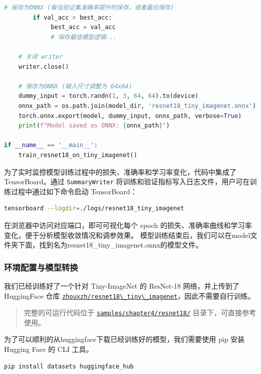 \begin{lstlisting}[language=Python]
        # 保存为ONNX (每当验证集准确率提升时保存，或者最后保存)
        if val_acc > best_acc:
             best_acc = val_acc
             # 保存最佳模型逻辑...
    
    # 关闭 writer
    writer.close()

    # 保存为ONNX (输入尺寸调整为 64x64)
    dummy_input = torch.randn(1, 3, 64, 64).to(device)
    onnx_path = os.path.join(model_dir, 'resnet18_tiny_imagenet.onnx')
    torch.onnx.export(model, dummy_input, onnx_path, verbose=True)
    print(f"Model saved as ONNX: {onnx_path}")

if __name__ == '__main__':
    train_resnet18_on_tiny_imagenet()
\end{lstlisting}

为了实时监控模型训练过程中的损失、准确率和学习率变化，代码中集成了
TensorBoard。通过 \passthrough{\lstinline!SummaryWriter!}
将训练和验证指标写入日志文件，用户可在训练过程中通过如下命令启动
TensorBoard：

\begin{lstlisting}[language=bash]
tensorboard --logdir=./logs/resnet18_tiny_imagenet
\end{lstlisting}

在浏览器中访问对应端口，即可可视化每个 epoch
的损失、准确率曲线和学习率变化，便于分析模型收敛情况和调参效果。
模型训练结束后，我们可以在model文件夹下面，找到名为resnet18\_tiny\_imagenet.onnx的模型文件。

\subsubsection{环境配置与模型转换}\label{src-book-chapter4-h27}

我们已经训练好了一个针对 Tiny-ImageNet 的 ResNet-18 网络，并上传到了
HuggingFace 仓库
\href{https://huggingface.co/zhouxzh/resnet18_tiny_imagenet}{\passthrough{\lstinline!zhouxzh/resnet18\_tiny\_imagenet!}}，因此不需要自行训练。

\begin{quote}
完整的可运行代码位于
\href{https://github.com/zhouxzh/Ascend310/tree/master/samples/chapter4/resnet18/}{\passthrough{\lstinline!samples/chapter4/resnet18/!}}
目录下，可直接参考使用。
\end{quote}

为了可以顺利的从huggingface下载已经训练好的模型，我们需要使用 pip 安装
Hugging Face 的 CLI 工具。

\begin{lstlisting}[language=bash]
pip install datasets huggingface_hub
\end{lstlisting}


